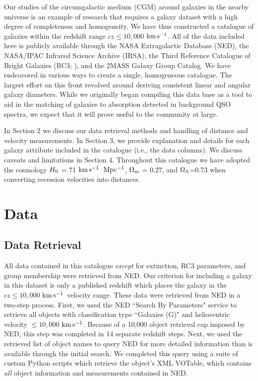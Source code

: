 \documentclass[twocolumn,tighten]{aastex62}
\newcommand{\kms}{$\rm km\, s^{-1}$}
\begin{document}
Our studies of the circumgalactic medium (CGM) around galaxies in the nearby universe is an example of research that requires a galaxy dataset with a high degree of completeness and homogeneity. We have thus constructed a catalogue of galaxies within the redshift range $cz \leq 10,000$ \kms. All of the data included here is publicly available through the NASA Extragalactic Database (NED), the NASA/IPAC Infrared Science Archive (IRSA), the Third Reference Catalogue of Bright Galaxies (RC3; \citealt{RC3}), and the \cite{tully2015} 2MASS Galaxy Group Catalog. We have endeavored in various ways to create a single, homogeneous catalogue. The largest effort on this front revolved around deriving consistent linear and angular galaxy diameters. While we originally began compiling this data base as a tool to aid in the matching of galaxies to absorption detected in background QSO spectra,  we expect that it will prove useful to the community at large. 

In Section 2 we discuss our data retrieval methods and handling of distance and velocity measurements. In Section 3, we provide explanation and details for each galaxy attribute included in the catalogue (i.e., the data columns). We discuss caveats and limitations in Section 4. Throughout this catalogue we have adopted the cosmology $H_{\rm 0}$ = 71 \kms ~$\rm Mpc^{-1}$, $\rm \Omega_m$ = 0.27, and $\rm \Omega_{\Lambda}$=0.73 when converting recession velocities into distances.

\section{Data}

\subsection{Data Retrieval}

All data contained in this catalogue \emph{except} for extinction, RC3 parameters, and group membership were retrieved from NED. Our criterion for including a galaxy in this dataset is only a published redshift which places the galaxy in the $cz \leq 10,000$ \kms~velocity range.  These data were retrieved from NED in a two-step process. First, we used the NED ``Search By Parameters" service to retrieve all objects with classification type ``Galaxies (G)" and heliocentric velocity $\leq 10,000$ \kms. Because of a 10,000 object retrieval cap imposed by NED, this step was completed in 14 separate redshift steps. Next, we used the retrieved list of object names to query NED for more detailed information than is available through the initial search. We completed this query using a suite of custom Python scripts which retrieve the object's XML VOTable, which contains \emph{all} object information and measurements contained in NED. 
\end{document}
